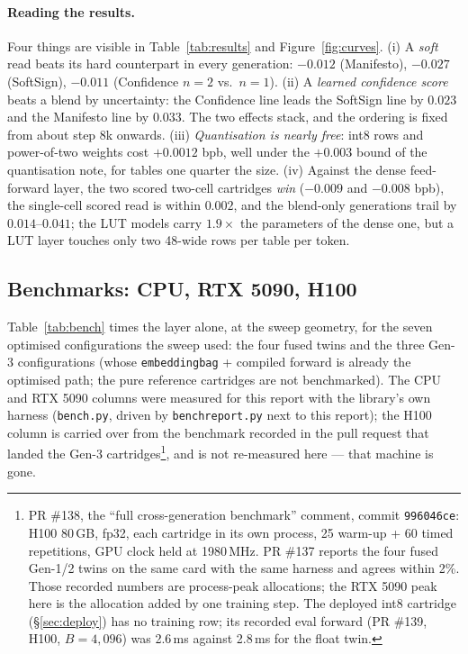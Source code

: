\documentclass[11pt]{article}
\DeclareRobustCommand{\code}[1]{{\renewcommand{\_}{\textunderscore\allowbreak}\texttt{#1}}}
\begin{document}
\paragraph{Reading the results.} Four things are visible in Table~\ref{tab:results} and
Figure~\ref{fig:curves}. (i) A \emph{soft} read beats its hard counterpart in every generation: $-0.012$
(Manifesto), $-0.027$ (SoftSign), $-0.011$ (Confidence $n{=}2$ vs.\ $n{=}1$). (ii) A \emph{learned
confidence score} beats a blend by uncertainty: the Confidence line leads the SoftSign line by $0.023$ and
the Manifesto line by $0.033$. The two effects stack, and the ordering is fixed from about step 8k
onwards. (iii) \emph{Quantisation is nearly free}: int8 rows and power-of-two weights cost $+0.0012$ bpb,
well under the $+0.003$ bound of the quantisation note, for tables one quarter the size. (iv) Against the
dense feed-forward layer, the two scored two-cell cartridges \emph{win} ($-0.009$ and $-0.008$ bpb), the
single-cell scored read is within $0.002$, and the blend-only generations trail by $0.014$--$0.041$; the
LUT models carry $1.9\times$ the parameters of the dense one, but a LUT layer touches only two 48-wide rows
per table per token.

\subsection{Benchmarks: CPU, RTX 5090, H100}
\label{sec:bench}
Table~\ref{tab:bench} times the layer alone, at the sweep geometry, for the seven optimised configurations
the sweep used: the four fused twins and the three Gen-3 configurations (whose \code{embedding\_bag} +
compiled forward is already the optimised path; the pure reference cartridges are not benchmarked). The
CPU and RTX 5090 columns were measured for this report with the library's own harness (\code{bench.py},
driven by \code{bench\_report.py} next to this report); the H100 column is carried over from the
benchmark recorded in the pull request that landed the Gen-3 cartridges\footnote{PR \#138, the
``full cross-generation benchmark'' comment, commit \code{996046ce}: H100 80\,GB, fp32, each cartridge in
its own process, 25 warm-up + 60 timed repetitions, GPU clock held at 1980\,MHz. PR \#137 reports the
four fused Gen-1/2 twins on the same card with the same harness and agrees within 2\%. Those recorded
numbers are process-peak allocations; the RTX 5090 peak here is the allocation added by one training
step. The deployed int8 cartridge (\S\ref{sec:deploy}) has no training row; its recorded eval forward
(PR \#139, H100, $B=4{,}096$) was 2.6\,ms against 2.8\,ms for the float twin.}, and is not re-measured
here --- that machine is gone.
\end{document}
